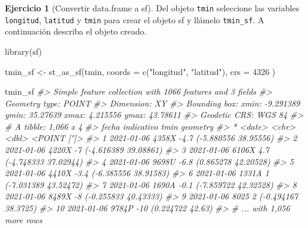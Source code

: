 \documentclass[
]{book}
\newenvironment{Shaded}{\begin{snugshade}}{\end{snugshade}}
\newcommand{\AttributeTok}[1]{\textcolor[rgb]{0.77,0.63,0.00}{#1}}
\newcommand{\CommentTok}[1]{\textcolor[rgb]{0.56,0.35,0.01}{\textit{#1}}}
\newcommand{\DecValTok}[1]{\textcolor[rgb]{0.00,0.00,0.81}{#1}}
\newcommand{\FunctionTok}[1]{\textcolor[rgb]{0.00,0.00,0.00}{#1}}
\newcommand{\NormalTok}[1]{#1}
\newcommand{\OtherTok}[1]{\textcolor[rgb]{0.56,0.35,0.01}{#1}}
\newcommand{\StringTok}[1]{\textcolor[rgb]{0.31,0.60,0.02}{#1}}
\theoremstyle{definition}
\theoremstyle{definition}
\theoremstyle{definition}
\newtheorem{exercise}{Ejercicio}[chapter]
\theoremstyle{definition}
\theoremstyle{remark}
\begin{document}
\begin{exercise}[Convertir data.frame a sf]
\protect\hypertarget{exr:ex5}{}\label{exr:ex5}Del objeto \texttt{tmin} seleccione las variables \texttt{longitud}, \texttt{latitud} y \texttt{tmin} para
crear el objeto sf y llámelo \texttt{tmin\_sf}. A continuación describa el objeto
creado.
\end{exercise}

\begin{Shaded}
\begin{Highlighting}[]
\FunctionTok{library}\NormalTok{(sf)}

\NormalTok{tmin\_sf }\OtherTok{\textless{}{-}} \FunctionTok{st\_as\_sf}\NormalTok{(tmin,}
  \AttributeTok{coords =} \FunctionTok{c}\NormalTok{(}\StringTok{"longitud"}\NormalTok{, }\StringTok{"latitud"}\NormalTok{),}
  \AttributeTok{crs =} \DecValTok{4326}
\NormalTok{)}

\NormalTok{tmin\_sf}
\CommentTok{\#\textgreater{} Simple feature collection with 1066 features and 3 fields}
\CommentTok{\#\textgreater{} Geometry type: POINT}
\CommentTok{\#\textgreater{} Dimension:     XY}
\CommentTok{\#\textgreater{} Bounding box:  xmin: {-}9.291389 ymin: 35.27639 xmax: 4.215556 ymax: 43.78611}
\CommentTok{\#\textgreater{} Geodetic CRS:  WGS 84}
\CommentTok{\#\textgreater{} \# A tibble: 1,066 x 4}
\CommentTok{\#\textgreater{}    fecha      indicativo  tmin             geometry}
\CommentTok{\#\textgreater{}  * \textless{}date\textgreater{}     \textless{}chr\textgreater{}      \textless{}dbl\textgreater{}          \textless{}POINT [°]\textgreater{}}
\CommentTok{\#\textgreater{}  1 2021{-}01{-}06 4358X       {-}4.7 ({-}5.880556 38.95556)}
\CommentTok{\#\textgreater{}  2 2021{-}01{-}06 4220X       {-}7   ({-}4.616389 39.08861)}
\CommentTok{\#\textgreater{}  3 2021{-}01{-}06 6106X        4.7 ({-}4.748333 37.02944)}
\CommentTok{\#\textgreater{}  4 2021{-}01{-}06 9698U       {-}6.8  (0.865278 42.20528)}
\CommentTok{\#\textgreater{}  5 2021{-}01{-}06 4410X       {-}3.4 ({-}6.385556 38.91583)}
\CommentTok{\#\textgreater{}  6 2021{-}01{-}06 1331A        1   ({-}7.031389 43.52472)}
\CommentTok{\#\textgreater{}  7 2021{-}01{-}06 1690A       {-}0.1 ({-}7.859722 42.32528)}
\CommentTok{\#\textgreater{}  8 2021{-}01{-}06 8489X       {-}8   ({-}0.255833 40.43333)}
\CommentTok{\#\textgreater{}  9 2021{-}01{-}06 8025         2    ({-}0.494167 38.3725)}
\CommentTok{\#\textgreater{} 10 2021{-}01{-}06 9784P      {-}10       (0.224722 42.63)}
\CommentTok{\#\textgreater{} \# ... with 1,056 more rows}
\end{Highlighting}
\end{Shaded}
\end{document}
